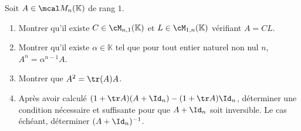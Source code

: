 Soit $A\in\mcal M_n(\mathbb K)$ de rang $1$.
\begin{enumerate}
    \item Montrer qu'il existe $C\in\cM_{n,1}(\mathbb K)$ et $L\in\cM_{1,n}(\mathbb K)$ vérifiant $A=CL$.
    \item  Montrer qu'il existe $\alpha\in\mathbb K$ tel que pour tout entier naturel non nul $n$, $A^n=\alpha^{n-1}A$.
    \item Montrer que $A^2 = \tr(A)A$. 
    \item Après avoir calculé $(1+\tr A)(A+\Id_n)-(1+\tr A)\Id_n$, déterminer une condition nécessaire et suffisante pour que $A+\Id_n$ soit inversible. Le cas échéant, déterminer $(A+\Id_n)^{-1}$.
\end{enumerate}
